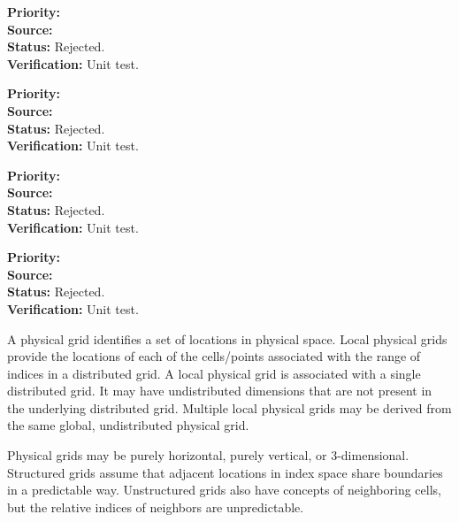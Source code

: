 \begin{reqlist}
{\bf Priority:}  \\
{\bf Source:} \\
{\bf Status:} Rejected. \\
{\bf Verification:} Unit test.
\end{reqlist}

\begin{reqlist}
{\bf Priority:}  \\
{\bf Source:} \\
{\bf Status:} Rejected. \\
{\bf Verification:} Unit test. 
\end{reqlist}

\begin{reqlist}
{\bf Priority:}  \\
{\bf Source:} \\
{\bf Status:} Rejected. \\
{\bf Verification:} Unit test.
\end{reqlist}

\begin{reqlist}
{\bf Priority:}  \\
{\bf Source:} \\
{\bf Status:} Rejected. \\
{\bf Verification:} Unit test. 
\end{reqlist}


A physical grid identifies a set of locations in physical space.  
Local physical grids provide the locations of each of the cells/points
associated with the range of indices in a distributed grid.  A local physical grid is
associated with a single distributed grid.  It may have undistributed dimensions that 
are not present in the underlying distributed grid. Multiple local 
physical grids may be derived from the same global, undistributed physical grid. 

Physical grids may be purely horizontal, purely vertical, or 3-dimensional. 
Structured grids assume that adjacent locations in index space share boundaries
in a predictable way.  Unstructured grids also have concepts of neighboring
cells, but the relative indices of neighbors are unpredictable.

